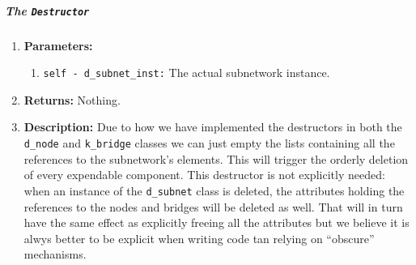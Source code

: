         \subparagraph{The \texttt{Destructor}}
            \begin{enumerate}
                \item \textbf{Parameters:}
                \begin{enumerate}
                    \item \texttt{self - d\_subnet\_inst:} The actual subnetwork instance.
                \end{enumerate}
                \item \textbf{Returns:} Nothing.
                \item \textbf{Description:} Due to how we have implemented the destructors in both the \texttt{d\_node} and \texttt{k\_bridge} classes we can just empty the lists containing all the references to the subnetwork's elements. This will trigger the orderly deletion of every expendable component. This destructor is not explicitly needed: when an instance of the \texttt{d\_subnet} class is deleted, the attributes holding the references to the nodes and bridges will be deleted as well. That will in turn have the same effect as explicitly freeing all the attributes but we believe it is alwys better to be explicit when writing code tan relying on ``obscure'' mechanisms.
            \end{enumerate}